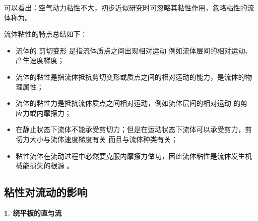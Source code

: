 可以看出：空气动力粘性不大，初步近似研究时可忽略其粘性作用，忽略粘性的流体称为。
\vspace*{0.5em}

\noindent 流体粘性的特点总结如下：
\vspace*{-0.5em}
\begin{itemize}
	\item 流体的 剪切变形 是指流体质点之间出现相对运动 例如流体层间的相对运动、产生速度梯度；\vspace*{-0.5em}
	\item 流体的粘性是指流体抵抗剪切变形或质点之间的相对运动的能力，是流体的物理属性；\vspace*{-0.5em}
	\item 流体的粘性力是抵抗流体质点之间相对运动，例如流体层间的相对运动 的剪应力或内摩擦力；\vspace*{-0.5em}
	\item 在静止状态下流体不能承受剪切力；但是在运动状态下流体可以承受剪力，剪切力大小与流体速度梯度有关 而且与流体种类有关；\vspace*{-0.5em}
	\item 粘性流体在流动过程中必然要克服内摩擦力做功，因此流体粘性是流体发生机械能损失的根源 。
\end{itemize}

\subsection{粘性对流动的影响}
\noindent \textbf{1. 绕平板的直匀流}

































